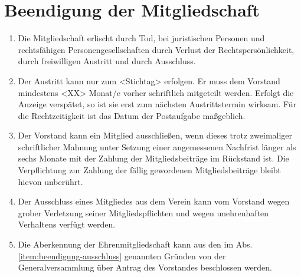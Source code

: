 \documentclass[a4paper,12pt]{article}
\begin{document}
\section{Beendigung der Mitgliedschaft} %
\label{sec:Mitgliedschaft-Beendigung}
\begin{enumerate}
\item Die Mitgliedschaft erlischt durch Tod, bei juristischen Personen und rechtsfähigen Personengesellschaften durch Verlust der Rechtspersönlichkeit, durch freiwilligen Austritt und durch Ausschluss.
\item Der Austritt kann nur zum <Stichtag> erfolgen. Er muss dem Vorstand %
mindestens <XX> Monat/e vorher schriftlich mitgeteilt werden. Erfolgt die %
Anzeige verspätet, so ist sie erst zum nächsten Austrittstermin wirksam. 
Für die Rechtzeitigkeit ist das Datum der Postaufgabe maßgeblich.
\item Der Vorstand kann ein Mitglied ausschließen, wenn dieses trotz zweimaliger schriftlicher Mahnung unter Setzung einer angemessenen Nachfrist länger als sechs Monate mit der Zahlung der Mitgliedsbeiträge im Rückstand ist. Die Verpflichtung zur Zahlung der fällig gewordenen Mitgliedsbeiträge bleibt hievon unberührt.
\item\label{item:beendigung-ausschluss} Der Ausschluss eines Mitgliedes aus dem Verein kann vom Vorstand wegen grober Verletzung seiner Mitgliedspflichten und wegen unehrenhaften Verhaltens verfügt werden.
\item Die Aberkennung der Ehrenmitgliedschaft kann aus den im Abs. \ref{item:beendigung-ausschluss} genannten Gründen von der Generalversammlung über Antrag des Vorstandes beschlossen werden.
\end{enumerate}
\end{document}
